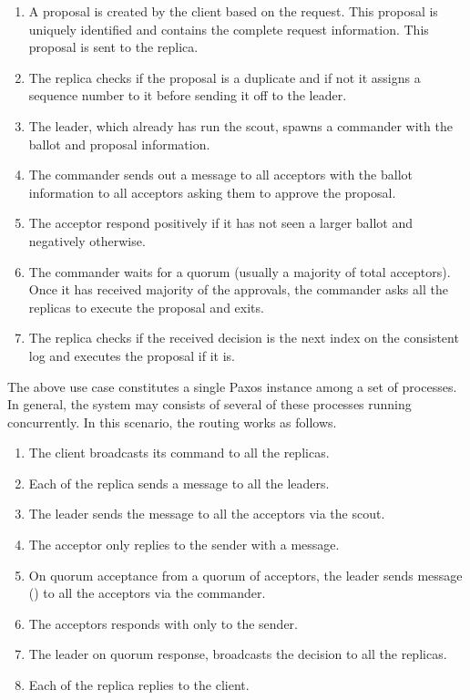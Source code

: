 \begin{enumerate}
    \item A proposal is created by the client based on the request. This
      proposal is uniquely identified and contains the complete request
      information. This proposal is sent to the replica.
    \item The replica checks if the proposal is a duplicate and if not it
      assigns a sequence number%
      to it before sending it off to the leader.
    \item The leader, which already has run the scout, spawns a commander with
      the ballot and proposal information.
    \item The commander sends out a message to all acceptors with the ballot
      information to all acceptors asking them to approve the proposal.
    \item The acceptor respond positively if it has not seen a larger
      ballot and negatively otherwise.
    \item The commander waits for a quorum (usually a majority of total
      acceptors). Once it has received majority of the approvals,
      the commander asks all the replicas to execute the proposal and exits.
    \item The replica checks if the received decision is the next index on
      the consistent log and executes the proposal if it is.
\end{enumerate}

The above use case constitutes a single Paxos instance among a set of processes.
In general, the system may consists of several of these processes running
concurrently. In this scenario, the routing works as follows.

\begin{enumerate}
  \item The client broadcasts its command to all the replicas.
  \item Each of the replica sends a  message to all the leaders.
  \item The leader sends the  message to all the acceptors via the 
    scout.
  \item The acceptor only replies to the sender with a  message.
  \item On quorum acceptance from a quorum of acceptors, the leader sends
     message () to all the acceptors via the commander.
  \item The acceptors responds with  only to the sender.
  \item The leader on quorum response, broadcasts the decision to all the
    replicas.
  \item Each of the replica replies to the client.
\end{enumerate}

